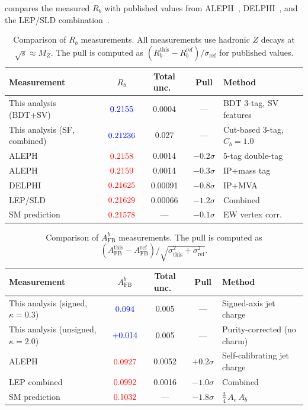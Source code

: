 \documentclass[11pt,a4paper]{article}
\newcommand{\measured}[1]{\textcolor{blue}{#1}}
\newcommand{\external}[1]{\textcolor{red}{#1}}
\begin{document}
 compares the measured $R_b$ with published
values from ALEPH~\cite{ALEPH:Rb:1996,ALEPH:Rb:precise},
DELPHI~\cite{DELPHI:Rb}, and the LEP/SLD
combination~\cite{LEP:EWWG:2005}.

\begin{table}[htbp]
\centering
\caption{Comparison of $R_b$ measurements.
All measurements use hadronic $Z$ decays at $\sqrt{s} \approx M_Z$.
The pull is computed as $(R_b^\text{this} - R_b^\text{ref}) /
\sigma_\text{ref}$ for published values.}
\label{tbl:comparison_rb}
\begin{tabular}{lcccl}
\toprule
Measurement & $R_b$ & Total unc.\ & Pull & Method \\
\midrule
This analysis (BDT+SV) & $\measured{0.2155}$ & 0.0004 & --- &
  BDT 3-tag, SV features \\
This analysis (SF, combined) & $\measured{0.21236}$ & 0.027 & --- &
  Cut-based 3-tag, $C_b=1.0$ \\
ALEPH~\cite{ALEPH:Rb:1996} & $\external{0.2158}$ & 0.0014 &
  $-0.2\sigma$ & 5-tag double-tag \\
ALEPH~\cite{ALEPH:Rb:precise} & $\external{0.2159}$ & 0.0014 &
  $-0.3\sigma$ & IP+mass tag \\
DELPHI~\cite{DELPHI:Rb} & $\external{0.21625}$ & 0.00091 &
  $-0.8\sigma$ & IP+MVA \\
LEP/SLD~\cite{LEP:EWWG:2005} & $\external{0.21629}$ & 0.00066 &
  $-1.2\sigma$ & Combined \\
SM prediction & $\external{0.21578}$ & --- & $-0.1\sigma$ &
  EW vertex corr.\ \\
\bottomrule
\end{tabular}
\end{table}

\begin{table}[htbp]
\centering
\caption{Comparison of $A_\text{FB}^b$ measurements.
The pull is computed as $(A_\text{FB}^\text{this} -
A_\text{FB}^\text{ref}) / \sqrt{\sigma_\text{this}^2 +
\sigma_\text{ref}^2}$.}
\label{tbl:comparison_afb}
\begin{tabular}{lcccl}
\toprule
Measurement & $A_\text{FB}^b$ & Total unc.\ & Pull & Method \\
\midrule
This analysis (signed, $\kappa=0.3$) & $\measured{0.094}$ & 0.005 &
  --- & Signed-axis jet charge \\
This analysis (unsigned, $\kappa=2.0$) & $\measured{+0.014}$ & 0.005 &
  --- & Purity-corrected (no charm) \\
ALEPH~\cite{ALEPH:AFBb} & $\external{0.0927}$ & 0.0052 &
  $+0.2\sigma$ & Self-calibrating jet charge \\
LEP combined~\cite{LEP:EWWG:2005} & $\external{0.0992}$ & 0.0016 &
  $-1.0\sigma$ & Combined \\
SM prediction & $\external{0.1032}$ & --- &
  $-1.8\sigma$ & $\frac{3}{4}\,A_e\,A_b$ \\
\bottomrule
\end{tabular}
\end{table}
\end{document}
